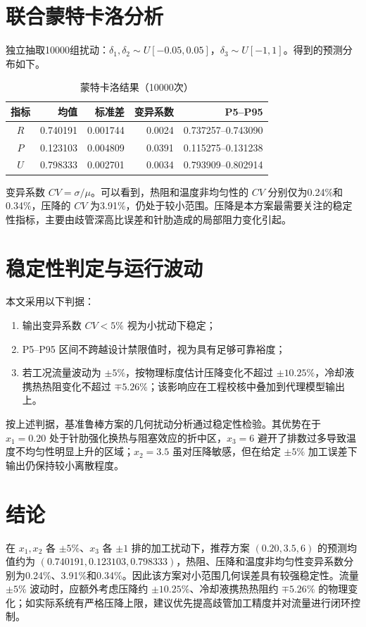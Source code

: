 \documentclass[UTF8,a4paper,12pt]{ctexart}
\begin{document}
\section{联合蒙特卡洛分析}
独立抽取10000组扰动：$\delta_1,\delta_2\sim U[-0.05,0.05]$，$\delta_3\sim U[-1,1]$。得到的预测分布如下。
\begin{table}[h]\centering\caption{蒙特卡洛结果（10000次）}
\begin{tabular}{c|rrrr}\toprule
指标 & 均值 & 标准差 & 变异系数 & P5--P95\\\midrule
$R$&0.740191&0.001744&0.0024&0.737257--0.743090\\
$P$&0.123103&0.004809&0.0391&0.115275--0.131238\\
$U$&0.798333&0.002701&0.0034&0.793909--0.802914\\
\bottomrule\end{tabular}\end{table}

变异系数 $CV=\sigma/\mu$。可以看到，热阻和温度非均匀性的 $CV$ 分别仅为0.24\%和0.34\%，压降的 $CV$ 为3.91\%，仍处于较小范围。压降是本方案最需要关注的稳定性指标，主要由歧管深高比误差和针肋造成的局部阻力变化引起。

\section{稳定性判定与运行波动}
本文采用以下判据：
\begin{enumerate}
\item 输出变异系数 $CV<5\%$ 视为小扰动下稳定；
\item P5--P95 区间不跨越设计禁限值时，视为具有足够可靠裕度；
\item 若工况流量波动为 $\pm5\%$，按物理标度估计压降变化不超过 $\pm10.25\%$，冷却液携热热阻变化不超过 $\mp5.26\%$；该影响应在工程校核中叠加到代理模型输出上。
\end{enumerate}
按上述判据，基准鲁棒方案的几何扰动分析通过稳定性检验。其优势在于 $x_1=0.20$ 处于针肋强化换热与阻塞效应的折中区，$x_3=6$ 避开了排数过多导致温度不均匀性明显上升的区域；$x_2=3.5$ 虽对压降敏感，但在给定 $\pm5\%$ 加工误差下输出仍保持较小离散程度。

\section{结论}
在 $x_1,x_2$ 各 $\pm5\%$、$x_3$ 各 $\pm1$ 排的加工扰动下，推荐方案 $(0.20,3.5,6)$ 的预测均值约为 $(0.740191,0.123103,0.798333)$，热阻、压降和温度非均匀性变异系数分别为0.24\%、3.91\%和0.34\%。因此该方案对小范围几何误差具有较强稳定性。流量 $\pm5\%$ 波动时，应额外考虑压降约 $\pm10.25\%$、冷却液携热热阻约 $\mp5.26\%$ 的物理变化；如实际系统有严格压降上限，建议优先提高歧管加工精度并对流量进行闭环控制。
\end{document}
